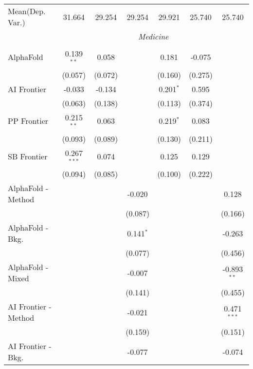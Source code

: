 \begin{tabular}{lcccccc}
Mean(Dep. Var.) & 31.664 & 29.254 & 29.254 & 29.921 & 25.740 & 25.740 \\
 & \multicolumn{6}{c}{\textit{Medicine}} \\ \\
   AlphaFold            & 0.139$^{**}$  & 0.058   &                & 0.181       & -0.075  &   \\   
                        & (0.057)       & (0.072) &                & (0.160)     & (0.275) &   \\   
   AI Frontier          & -0.033        & -0.134  &                & 0.201$^{*}$ & 0.595   &   \\   
                        & (0.063)       & (0.138) &                & (0.113)     & (0.374) &   \\   
   PP Frontier          & 0.215$^{**}$  & 0.063   &                & 0.219$^{*}$ & 0.083   &   \\   
                        & (0.093)       & (0.089) &                & (0.130)     & (0.211) &   \\   
   SB Frontier          & 0.267$^{***}$ & 0.074   &                & 0.125       & 0.129   &   \\   
                        & (0.094)       & (0.085) &                & (0.100)     & (0.222) &   \\   
   AlphaFold - Method   &               &         & -0.020         &             &         & 0.128\\   
                        &               &         & (0.087)        &             &         & (0.166)\\   
   AlphaFold - Bkg.     &               &         & 0.141$^{*}$    &             &         & -0.263\\   
                        &               &         & (0.077)        &             &         & (0.456)\\   
   AlphaFold - Mixed    &               &         & -0.007         &             &         & -0.893$^{**}$\\   
                        &               &         & (0.141)        &             &         & (0.455)\\   
   AI Frontier - Method &               &         & -0.021         &             &         & 0.471$^{***}$\\   
                        &               &         & (0.159)        &             &         & (0.151)\\   
   AI Frontier - Bkg.   &               &         & -0.077         &             &         & -0.074\\   

\end{tabular}
